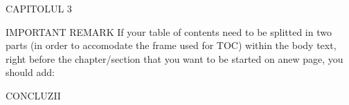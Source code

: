 \documentclass[12pt,a4paper,titlepage]{article}
\begin{document}





\tableofcontents
{} %
\cleardoublepage

\listoffigures
{}
\clearpage

\lstlistoflistings
{}
\thispagestyle{empty}
\clearpage

{}

\thispagestyle{empty}
\cleardoublepage

{}

\cleardoublepage


\cleardoublepage


\cleardoublepage

CAPITOLUL 3

\cleardoublepage


\cleardoublepage

IMPORTANT REMARK
If your table of contents need to be splitted in two parts (in order to accomodate the frame used for TOC)
within the body text, right before the chapter/section that you want to be started on anew page,
you should add:     

CONCLUZII
{}

\cleardoublepage

\cleardoublepage
{}

\cleardoublepage

\end{document}
